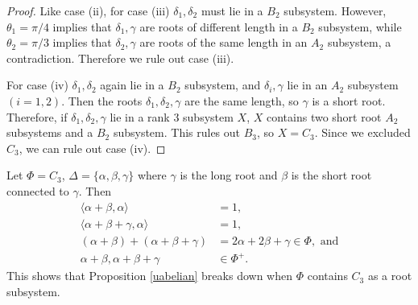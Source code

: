 \begin{proof}
Like case (ii), for case (iii) $\delta_1, \delta_2$ must lie in a $B_2$ subsystem. However, $\theta_1 = \pi/4$ implies that $\delta_1, \gamma$ are roots of different length in a $B_2$ subsystem, while $\theta_2 = \pi/3$ implies that $\delta_2, \gamma$ are roots of the same length in an $A_2$ subsystem, a contradiction. Therefore we rule out case (iii).

For case (iv) $\delta_1, \delta_2$ again lie in a $B_2$ subsystem, and $\delta_i, \gamma$ lie in an $A_2$ subsystem $(i = 1, 2)$. Then the roots $\delta_1, \delta_2, \gamma$ are the same length, so $\gamma$ is a short root. Therefore, if $\delta_1, \delta_2, \gamma$  lie in a rank 3 subsystem $X$, $X$ contains two short root $A_2$ subsystems and a $B_2$ subsystem. This rules out $B_3$, so $X=C_3$. Since we excluded $C_3$, we can rule out case (iv).
\end{proof}

\begin{remark}\label{c3counter}
Let $\Phi = C_3$, $\Delta = \{\alpha, \beta, \gamma\}$ where $\gamma$ is the long root and $\beta$ is the short root connected to $\gamma$. Then
\begin{align*}
	\langle \alpha + \beta, \alpha \rangle &= 1, \\
	\langle \alpha + \beta + \gamma, \alpha \rangle &= 1, \\
	(\alpha + \beta) + (\alpha + \beta + \gamma) &= 2\alpha + 2\beta + \gamma \in \Phi, \textrm{ and} \\
	\alpha + \beta, \alpha + \beta + \gamma &\in \Phi^+.
\end{align*}
This shows that Proposition \ref{uabelian} breaks down when $\Phi$ contains $C_3$ as a root subsystem. 
\end{remark}

